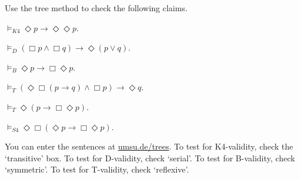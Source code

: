 
\begin{exercise}
  Use the tree method to check the following claims.
  \begin{exlist}
    \item $\models_{K4} \Diamond p \to \Diamond\Diamond p$.
    \item $\models_{D} (\Box p \land \Box q) \to \Diamond (p \lor q)$.
    \item $\models_{B} \Diamond p \to \Box\Diamond p$.
    \item $\models_{T} (\Diamond\Box(p \to q) \land \Box p) \to \Diamond q$.
    \item $\models_{T} \Diamond (p \to \Box \Diamond p)$.
    \item $\models_{S4} \Diamond\Box(\Diamond p \to \Box\Diamond p)$. 
  \end{exlist}
\end{exercise}
\begin{solution}
  You can enter the sentences at
  \href{https://www.umsu.de/trees/}{umsu.de/trees}. To
  test for K4-validity, check the `transitive' box. To test for D-validity, check `serial'. To test for B-validity, check `symmetric'. To test for T-validity, check `reflexive'.
\end{solution}






